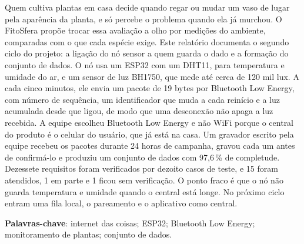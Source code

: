 
\begin{resumo}
Quem cultiva plantas em casa decide quando regar ou mudar um vaso de
lugar pela aparência da planta, e só percebe o problema quando ela já
murchou. O FitoSfera propõe trocar essa avaliação a olho por medições do
ambiente, comparadas com o que cada espécie exige. Este relatório
documenta o segundo ciclo do projeto: a ligação do nó sensor a quem
guarda o dado e a formação do conjunto de dados. O nó usa um ESP32 com um
DHT11, para temperatura e umidade do ar, e um sensor de luz BH1750, que
mede até cerca de 120 mil lux. A cada cinco minutos, ele envia um pacote
de 19 bytes por Bluetooth Low Energy, com número de sequência, um
identificador que muda a cada reinício e a luz acumulada desde que ligou,
de modo que uma desconexão não apaga a luz recebida. A equipe escolheu
Bluetooth Low Energy e não WiFi porque o central do produto é o celular
do usuário, que já está na casa. Um gravador escrito pela equipe recebeu
os pacotes durante 24 horas de campanha, gravou cada um antes de
confirmá-lo e produziu um conjunto de dados com 97,6\,\% de
completude. Dezessete requisitos foram verificados por dezoito casos de
teste, e 15 foram atendidos, 1 em parte e 1 ficou sem verificação. O ponto fraco é que o nó não guarda
temperatura e umidade quando o central está longe. No próximo ciclo
entram uma fila local, o pareamento e o aplicativo como central.

\textbf{Palavras-chave}: internet das coisas; ESP32; Bluetooth Low Energy;
monitoramento de plantas; conjunto de dados.
\end{resumo}

